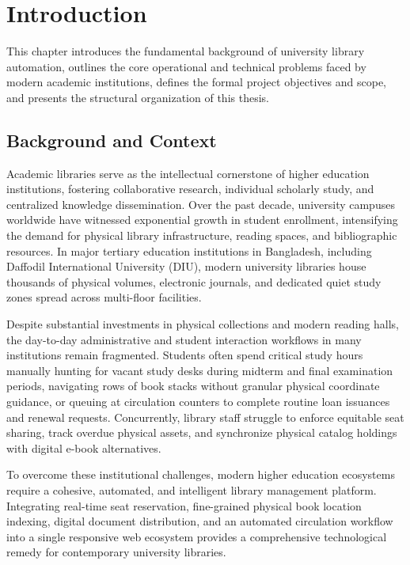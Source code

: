 \cleardoublepage
{}
\setcounter{page}{1}

\chapter{Introduction}

This chapter introduces the fundamental background of university library automation, outlines the core operational and technical problems faced by modern academic institutions, defines the formal project objectives and scope, and presents the structural organization of this thesis.

\section{Background and Context}
Academic libraries serve as the intellectual cornerstone of higher education institutions, fostering collaborative research, individual scholarly study, and centralized knowledge dissemination. Over the past decade, university campuses worldwide have witnessed exponential growth in student enrollment, intensifying the demand for physical library infrastructure, reading spaces, and bibliographic resources. In major tertiary education institutions in Bangladesh, including Daffodil International University (DIU), modern university libraries house thousands of physical volumes, electronic journals, and dedicated quiet study zones spread across multi-floor facilities.

Despite substantial investments in physical collections and modern reading halls, the day-to-day administrative and student interaction workflows in many institutions remain fragmented. Students often spend critical study hours manually hunting for vacant study desks during midterm and final examination periods, navigating rows of book stacks without granular physical coordinate guidance, or queuing at circulation counters to complete routine loan issuances and renewal requests. Concurrently, library staff struggle to enforce equitable seat sharing, track overdue physical assets, and synchronize physical catalog holdings with digital e-book alternatives. 

To overcome these institutional challenges, modern higher education ecosystems require a cohesive, automated, and intelligent library management platform. Integrating real-time seat reservation, fine-grained physical book location indexing, digital document distribution, and an automated circulation workflow into a single responsive web ecosystem provides a comprehensive technological remedy for contemporary university libraries.

